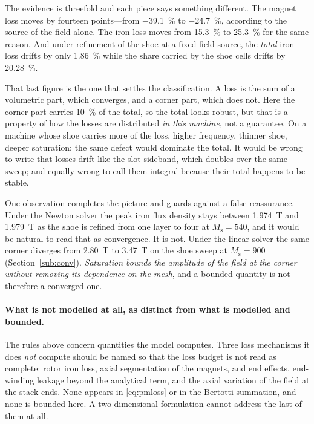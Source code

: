 \documentclass[10pt,a4paper,twocolumn]{article}
\theoremstyle{plain}
\theoremstyle{remark}
\begin{document}
The evidence is threefold and each piece says something different. The
magnet loss moves by fourteen points---from \SI{-39.1}{\percent} to
\SI{-24.7}{\percent}, according to the source of the field alone. The
iron loss moves from \SI{+15.3}{\percent} to \SI{+25.3}{\percent} for
the same reason. And under refinement of the shoe at a fixed field
source, the \emph{total} iron loss drifts by only \SI{1.86}{\percent}
while the share carried by the shoe cells drifts by
\SI{20.28}{\percent}.

That last figure is the one that settles the classification. A loss is
the sum of a volumetric part, which converges, and a corner part, which
does not. Here the corner part carries \SI{10}{\percent} of the total,
so the total looks robust, but that is a property of how the losses are
distributed \emph{in this machine}, not a guarantee. On a machine whose
shoe carries more of the loss, higher frequency, thinner shoe, deeper
saturation: the same defect would dominate the total. It would be wrong
to write that losses drift like the slot sideband, which doubles over
the same sweep; and equally wrong to call them integral because their
total happens to be stable.

One observation completes the picture and guards against a false
reassurance. Under the Newton solver the peak iron flux density stays
between \SI{1.974}{\tesla} and \SI{1.979}{\tesla} as the shoe is refined
from one layer to four at $M_{\mathrm{s}}=540$, and it would be natural
to read that as convergence. It is not. Under the linear solver the same
corner diverges from \SI{2.80}{\tesla} to \SI{3.47}{\tesla} on the shoe
sweep at $M_{\mathrm{s}}=900$ (Section~\ref{sub:conv}).
\emph{Saturation bounds the amplitude of the field at the corner without
removing its dependence on the mesh}, and a bounded quantity is not
therefore a converged one.

\paragraph{What is not modelled at all, as distinct from what is
modelled and bounded.}
The rules above concern quantities the model computes. Three loss
mechanisms it does \emph{not} compute should be named so that the loss
budget is not read as complete: rotor iron loss, axial segmentation of
the magnets, and end effects, end-winding leakage beyond the analytical
term, and the axial variation of the field at the stack ends. None
appears in \eqref{eq:pmloss} or in the Bertotti summation, and none is
bounded here. A two-dimensional formulation cannot address the last of
them at all.
\end{document}
